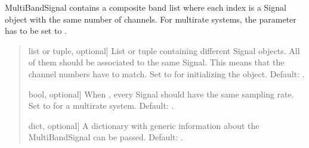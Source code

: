 \documentclass[letterpaper,10pt,english]{sphinxmanual}
\begin{document}
\begin{fulllineitems}
\begin{fulllineitems}
\label{\detokenize{classes:dsptools.classes.multibandsignal.MultiBandSignal.__init__}}
\pysigstartsignatures
{}
\pysigstopsignatures
\sphinxAtStartPar
MultiBandSignal contains a composite band list where each index
is a Signal object with the same number of channels. For multirate
systems, the parameter  has to be set to .
\begin{quote}\begin{description}
\begin{description}
\sphinxlineitem{\sphinxstylestrong{bands}}{[}list or tuple, optional{]}
\sphinxAtStartPar
List or tuple containing different Signal objects. All of them
should be associated to the same Signal. This means that the
channel numbers have to match. Set to  for initializing the
object. Default: .

\sphinxlineitem{\sphinxstylestrong{same\_sampling\_rate}}{[}bool, optional{]}
\sphinxAtStartPar
When , every Signal should have the same sampling rate.
Set to  for a multirate system. Default: .

\sphinxlineitem{\sphinxstylestrong{info}}{[}dict, optional{]}
\sphinxAtStartPar
A dictionary with generic information about the MultiBandSignal
can be passed. Default: .

\end{description}

\end{description}\end{quote}

\end{fulllineitems}



\end{fulllineitems}
\end{document}
